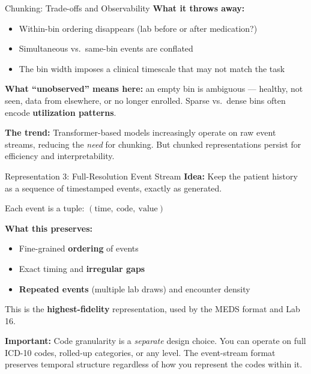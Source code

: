 \documentclass[aspectratio=169,10pt]{beamer}
\begin{document}
\begin{frame}{Chunking: Trade-offs and Observability}
\textbf{What it throws away:}
\begin{itemize}[<+->]
    \item Within-bin ordering disappears (lab before or after medication?)
    \item Simultaneous vs.\ same-bin events are conflated
    \item The bin width imposes a clinical timescale that may not match the task
\end{itemize}
\vspace{0.2em}
\textbf{What ``unobserved'' means here:} an empty bin is ambiguous --- healthy, not seen, data from elsewhere, or no longer enrolled.  Sparse vs.\ dense bins often encode \textbf{utilization patterns}.
\vspace{0.3em}

\textbf{The trend:} Transformer-based models increasingly operate on raw event streams, reducing the \emph{need} for chunking. But chunked representations persist for efficiency and interpretability.
\end{frame}


\begin{frame}{Representation 3: Full-Resolution Event Stream}
\textbf{Idea:} Keep the patient history as a sequence of timestamped events, exactly as generated.

Each event is a tuple: $(\text{time},\ \text{code},\ \text{value})$
\vspace{0.3em}

\textbf{What this preserves:}
\begin{itemize}[<+->]
    \item Fine-grained \textbf{ordering} of events
    \item Exact timing and \textbf{irregular gaps}
    \item \textbf{Repeated events} (multiple lab draws) and encounter density
\end{itemize}
\vspace{0.2em}
This is the \textbf{highest-fidelity} representation, used by the MEDS format and Lab 16.

\vspace{0.2em}
\textbf{Important:} Code granularity is a \emph{separate} design choice. You can operate on full ICD-10 codes, rolled-up categories, or any level. The event-stream format preserves temporal structure regardless of how you represent the codes within it.
\end{frame}
\end{document}
